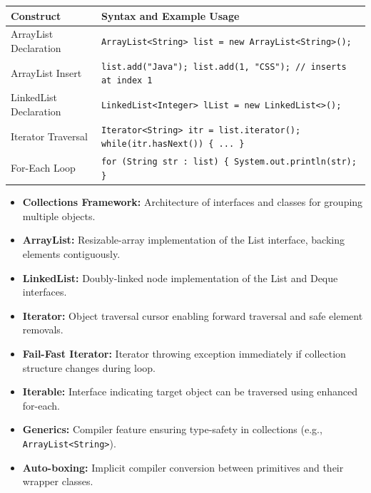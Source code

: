 \documentclass[12pt,a4paper]{article}
\renewcommand{\arraystretch}{1.45}
\begin{document}
\begin{tcolorbox}[formulabox, title={\textbf{Collection Syntax}}]
{\renewcommand{\arraystretch}{1.3}%
\begin{tabularx}{\linewidth}{l Y}
\textbf{Construct} & \textbf{Syntax and Example Usage} \\
\hline
ArrayList Declaration & \texttt{ArrayList<String> list = new ArrayList<String>();} \\
ArrayList Insert & \texttt{list.add("Java"); list.add(1, "CSS"); // inserts at index 1} \\
LinkedList Declaration & \texttt{LinkedList<Integer> lList = new LinkedList<>();} \\
Iterator Traversal & \texttt{Iterator<String> itr = list.iterator(); while(itr.hasNext()) \{ ... \}} \\
For-Each Loop & \texttt{for (String str : list) \{ System.out.println(str); \}} \\
\end{tabularx}}
\end{tcolorbox}

\begin{tcolorbox}[defbox, title={\textbf{One-Line Definitions}}]
\begin{itemize}[leftmargin=*, itemsep=2pt]
  \item \textbf{Collections Framework:} Architecture of interfaces and classes for grouping multiple objects.
  \item \textbf{ArrayList:} Resizable-array implementation of the List interface, backing elements contiguously.
  \item \textbf{LinkedList:} Doubly-linked node implementation of the List and Deque interfaces.
  \item \textbf{Iterator:} Object traversal cursor enabling forward traversal and safe element removals.
  \item \textbf{Fail-Fast Iterator:} Iterator throwing exception immediately if collection structure changes during loop.
  \item \textbf{Iterable:} Interface indicating target object can be traversed using enhanced for-each.
  \item \textbf{Generics:} Compiler feature ensuring type-safety in collections (e.g., \texttt{ArrayList<String>}).
  \item \textbf{Auto-boxing:} Implicit compiler conversion between primitives and their wrapper classes.
\end{itemize}
\end{tcolorbox}
\end{document}
